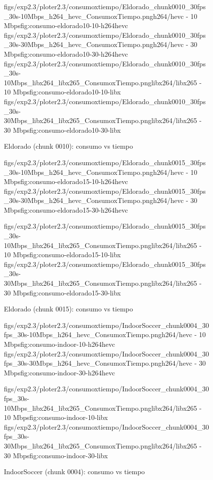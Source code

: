 \begin{figure}[H]
  \centering
  \small
  \dosubfigs
    {figs/exp2.3/ploter2.3/consumoxtiempo/Eldorado_chunk0010_30fps_30s-10Mbps_h264_hevc_ConsumoxTiempo.png}{h264/hevc - 10 Mbps}{fig:consumo-eldorado10-10-h264hevc}
    {figs/exp2.3/ploter2.3/consumoxtiempo/Eldorado_chunk0010_30fps_30s-30Mbps_h264_hevc_ConsumoxTiempo.png}{h264/hevc - 30 Mbps}{fig:consumo-eldorado10-30-h264hevc}
  \dosubfigs
    {figs/exp2.3/ploter2.3/consumoxtiempo/Eldorado_chunk0010_30fps_30s-10Mbps_libx264_libx265_ConsumoxTiempo.png}{libx264/libx265 - 10 Mbps}{fig:consumo-eldorado10-10-libx}
    {figs/exp2.3/ploter2.3/consumoxtiempo/Eldorado_chunk0010_30fps_30s-30Mbps_libx264_libx265_ConsumoxTiempo.png}{libx264/libx265 - 30 Mbps}{fig:consumo-eldorado10-30-libx}
  \caption{Eldorado (chunk 0010): consumo vs tiempo}
  \label{fig:consumo-eldorado10}
\end{figure}

\begin{figure}[H]
  \centering
  \small
  \dosubfigs
    {figs/exp2.3/ploter2.3/consumoxtiempo/Eldorado_chunk0015_30fps_30s-10Mbps_h264_hevc_ConsumoxTiempo.png}{h264/hevc - 10 Mbps}{fig:consumo-eldorado15-10-h264hevc}
    {figs/exp2.3/ploter2.3/consumoxtiempo/Eldorado_chunk0015_30fps_30s-30Mbps_h264_hevc_ConsumoxTiempo.png}{h264/hevc - 30 Mbps}{fig:consumo-eldorado15-30-h264hevc}
  
  \dosubfigs
    {figs/exp2.3/ploter2.3/consumoxtiempo/Eldorado_chunk0015_30fps_30s-10Mbps_libx264_libx265_ConsumoxTiempo.png}{libx264/libx265 - 10 Mbps}{fig:consumo-eldorado15-10-libx}
    {figs/exp2.3/ploter2.3/consumoxtiempo/Eldorado_chunk0015_30fps_30s-30Mbps_libx264_libx265_ConsumoxTiempo.png}{libx264/libx265 - 30 Mbps}{fig:consumo-eldorado15-30-libx}
  \caption{Eldorado (chunk 0015): consumo vs tiempo}
  \label{fig:consumo-eldorado15}
\end{figure}

\begin{figure}[H]
  \centering
  \small
  \dosubfigs
    {figs/exp2.3/ploter2.3/consumoxtiempo/IndoorSoccer_chunk0004_30fps_30s-10Mbps_h264_hevc_ConsumoxTiempo.png}{h264/hevc - 10 Mbps}{fig:consumo-indoor-10-h264hevc}
    {figs/exp2.3/ploter2.3/consumoxtiempo/IndoorSoccer_chunk0004_30fps_30s-30Mbps_h264_hevc_ConsumoxTiempo.png}{h264/hevc - 30 Mbps}{fig:consumo-indoor-30-h264hevc}
  
  \dosubfigs
    {figs/exp2.3/ploter2.3/consumoxtiempo/IndoorSoccer_chunk0004_30fps_30s-10Mbps_libx264_libx265_ConsumoxTiempo.png}{libx264/libx265 - 10 Mbps}{fig:consumo-indoor-10-libx}
    {figs/exp2.3/ploter2.3/consumoxtiempo/IndoorSoccer_chunk0004_30fps_30s-30Mbps_libx264_libx265_ConsumoxTiempo.png}{libx264/libx265 - 30 Mbps}{fig:consumo-indoor-30-libx}
  \caption{IndoorSoccer (chunk 0004): consumo vs tiempo}
  \label{fig:consumo-indoor}
\end{figure}

